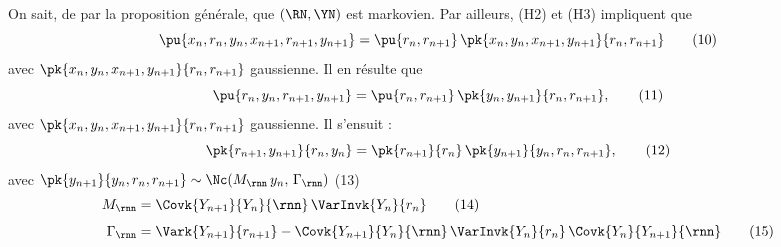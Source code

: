 \documentclass[12pt, a4paper]{article}
\begin{document}
\medskip
On sait, de par la proposition générale, que $(\RN, \YN)$ est markovien.
Par ailleurs, (H2) et (H3) impliquent que
\begin{equation}
  \pu{x_n, r_n, y_n, x_{n+1}, r_{n+1}, y_{n+1}}
  = \pu{r_n, r_{n+1}}\,\pk{x_n, y_n, x_{n+1}, y_{n+1}}{r_n, r_{n+1}}
  \tag{10}
\end{equation}
avec $\pk{x_n, y_n, x_{n+1}, y_{n+1}}{r_n, r_{n+1}}$ gaussienne. Il en résulte que
\begin{equation}
  \pu{r_n, y_n, r_{n+1}, y_{n+1}}
  = \pu{r_n, r_{n+1}}\,\pk{y_n, y_{n+1}}{r_n, r_{n+1}},
  \tag{11}
\end{equation}
avec $\pk{x_n, y_n, x_{n+1}, y_{n+1}}{r_n, r_{n+1}}$ gaussienne. Il s'ensuit :
\begin{equation}
  \pk{r_{n+1}, y_{n+1}}{r_n, y_n}
  = \pk{r_{n+1}}{r_n}\,\pk{y_{n+1}}{y_n, r_n, r_{n+1}},
  \tag{12}
\end{equation}
avec $\pk{y_{n+1}}{y_n, r_n, r_{n+1}} \sim \Nc(M_{\rnn}\,y_n,\,\Gamma_{\rnn})$
\hfill(13)
\begin{align}
  M_{\rnn} &= \Covk{Y_{n+1}}{Y_n}{\rnn}\,\VarInvk{Y_n}{r_n}
    \tag{14} \\[4pt]
  \Gamma_{\rnn} &= \Vark{Y_{n+1}}{r_{n+1}}
    - \Covk{Y_{n+1}}{Y_n}{\rnn}\,\VarInvk{Y_n}{r_n}\,\Covk{Y_n}{Y_{n+1}}{\rnn}
    \tag{15}
\end{align}
\end{document}
